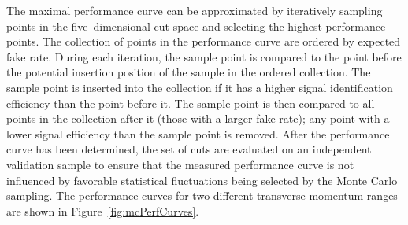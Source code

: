 The maximal performance curve can be approximated by iteratively sampling points
in the five--dimensional cut space and selecting the highest performance points.
The collection of points in the performance curve are ordered by expected fake
rate.  During each iteration, the sample point is compared to the point before
the potential insertion position of the sample in the ordered collection.  The
sample point is inserted into the collection if it has a higher signal
identification efficiency than the point before it.  The sample point is then
compared to all points in the collection after it (\ie those with a larger fake
rate); any point with a lower signal efficiency than the sample point is
removed.  After the performance curve has been determined, the set of cuts are
evaluated on an independent validation sample to ensure that the measured
performance curve is not influenced by favorable statistical fluctuations being
selected by the Monte Carlo sampling.  The performance curves for two different
transverse momentum ranges are shown in Figure~\ref{fig:mcPerfCurves}.

